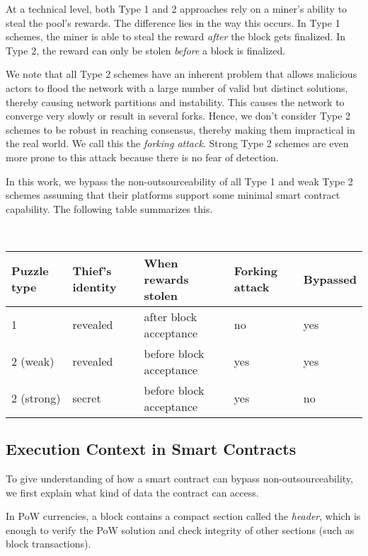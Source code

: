 \documentclass{llncs}
\begin{document}
At a technical level, both Type 1 and 2 approaches rely on a miner's ability to steal the pool's rewards. The difference lies in the way this occurs. In Type 1 schemes, the miner is able to steal the reward {\em after} the block gets finalized.
In Type 2, 
the reward can only be stolen {\em before} a block is finalized. 


We note that all Type 2 schemes have an inherent problem that allows malicious actors to flood the network with a large number of valid but distinct solutions, thereby causing network partitions and instability. This causes the network to converge very slowly or result in several forks. Hence, we don't consider Type 2 schemes to be robust in reaching consensus, thereby making them impractical in the real world. We call this the {\em forking attack}. Strong Type 2 schemes are even more prone to this attack because there is no fear of detection. %

In this work, we bypass the non-outsourceability of all Type 1 and weak Type 2 schemes assuming that their platforms support
some minimal smart contract capability. The following table summarizes this. 

~\\
	\begin{tabular}{|l|l|l|l|l|}\hline
		  Puzzle type     & Thief's identity   & When rewards stolen       & Forking attack &Bypassed \\\hline
		  1        & revealed              & after block acceptance   & no & yes             \\
		  2 (weak)   & revealed           & before block acceptance  & yes &yes            \\
		  2 (strong) & secret           & before block acceptance  & yes & no      \\\hline
	\end{tabular}

\subsection{Execution Context in Smart Contracts}
\label{context}

To give understanding of how a smart contract can bypass non-outsourceability, we first explain what kind of data the contract 
can access.

In PoW currencies, a block contains a compact section called the {\em header}, which is
enough to verify the PoW solution and check integrity of other sections (such as block transactions).
\end{document}
